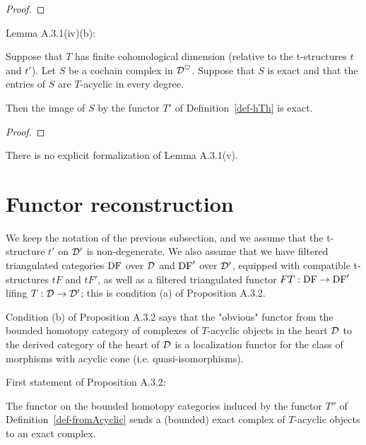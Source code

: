 \begin{proof}
\leanok
\end{proof}


Lemma A.3.1(iv)(b):

\begin{lemma}
\label{prop-exact_map_of_exact_acyclic_complex_and_bounded_functor}
\leanok 
{}
Suppose that $T$ has finite cohomological dimension (relative to the t-structures $t$ and $t'$).
Let $S$ be a cochain complex in $\mathcal{D}^\heartsuit$.
Suppose that $S$ is exact  and that
the entries of $S$ are $T$-acyclic in every degree.

Then the image of $S$ by the functor $T'$ of Definition~\ref{def-hTh} is exact.

\end{lemma}

\begin{proof}
\leanok
\end{proof}


There is no explicit formalization of Lemma A.3.1(v).


\section{Functor reconstruction}

We keep the notation of the previous subsection, and we assume that the t-structure $t'$ on $\mathcal{D}'$ is 
non-degenerate. We also assume that we have filtered triangulated categories $\operatorname{DF}$ over $\mathcal{D}$ and 
$\operatorname{DF}'$ over $\mathcal{D}'$, equipped with compatible t-structures $tF$ and $tF'$, as well as a filtered triangulated 
functor $FT:\operatorname{DF}\to\operatorname{DF}'$ lifing $T:\mathcal{D}\to\mathcal{D}'$; this is condition (a) of Proposition A.3.2.

Condition (b) of Proposition A.3.2 says that the "obvious" functor from the bounded homotopy category of
complexes of $T$-acyclic objects in the heart $\mathcal{D}$ to the derived category of the heart of $\mathcal{D}$
is a localization functor for the class of morphisms with acyclic cone (i.e. quasi-isomorphisms).

First statement of Proposition A.3.2:
\begin{proposition}
\label{prop-AcyclicComplexAcyclic_image}
\leanok 
{}

The functor on the bounded homotopy categories induced by the functor $T''$ of 
Definition~\ref{def-fromAcyclic}
sends a (bounded) exact complex of $T$-acyclic objects to an exact complex.

\end{proposition}


